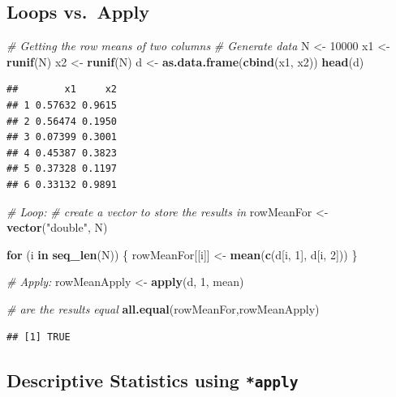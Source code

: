 \documentclass[]{book}
\makeatletter
\newenvironment{Shaded}{\begin{snugshade}}{\end{snugshade}}
\newcommand{\KeywordTok}[1]{\textcolor[rgb]{0.13,0.29,0.53}{\textbf{#1}}}
\newcommand{\DecValTok}[1]{\textcolor[rgb]{0.00,0.00,0.81}{#1}}
\newcommand{\StringTok}[1]{\textcolor[rgb]{0.31,0.60,0.02}{#1}}
\newcommand{\CommentTok}[1]{\textcolor[rgb]{0.56,0.35,0.01}{\textit{#1}}}
\newcommand{\ControlFlowTok}[1]{\textcolor[rgb]{0.13,0.29,0.53}{\textbf{#1}}}
\newcommand{\NormalTok}[1]{#1}
\newenvironment{kframe}{%
\medskip{}
\setlength{\fboxsep}{.8em}
 \def\at@end@of@kframe{}%
 \ifinner\ifhmode%
  \def\at@end@of@kframe{\end{minipage}}%
  \begin{minipage}{\columnwidth}%
 \fi\fi%
 \def\FrameCommand##1{\hskip\@totalleftmargin \hskip-\fboxsep
 \colorbox{shadecolor}{##1}\hskip-\fboxsep
     \hskip-\linewidth \hskip-\@totalleftmargin \hskip\columnwidth}%
 \MakeFramed {\advance\hsize-\width
   \@totalleftmargin\z@ \linewidth\hsize
   \@setminipage}}%
 {\par\unskip\endMakeFramed%
 \at@end@of@kframe}
\renewenvironment{Shaded}{\begin{kframe}}{\end{kframe}}
\theoremstyle{definition}
\theoremstyle{definition}
\theoremstyle{definition}
\theoremstyle{remark}
\makeatother
\begin{document}
\subsection{Loops vs.~Apply}\label{loops-vs.apply}

\begin{Shaded}
\begin{Highlighting}[]
\CommentTok{# Getting the row means of two columns}
\CommentTok{# Generate data}
\NormalTok{N <-}\StringTok{ }\DecValTok{10000}
\NormalTok{x1 <-}\StringTok{ }\KeywordTok{runif}\NormalTok{(N)}
\NormalTok{x2 <-}\StringTok{ }\KeywordTok{runif}\NormalTok{(N)}
\NormalTok{d <-}\StringTok{ }\KeywordTok{as.data.frame}\NormalTok{(}\KeywordTok{cbind}\NormalTok{(x1, x2))}
\KeywordTok{head}\NormalTok{(d)}
\end{Highlighting}
\end{Shaded}

\begin{verbatim}
##        x1     x2
## 1 0.57632 0.9615
## 2 0.56474 0.1950
## 3 0.07399 0.3001
## 4 0.45387 0.3823
## 5 0.37328 0.1197
## 6 0.33132 0.9891
\end{verbatim}

\begin{Shaded}
\begin{Highlighting}[]
\CommentTok{# Loop:}
\CommentTok{# create a vector to store the results in }
\NormalTok{rowMeanFor <-}\StringTok{ }\KeywordTok{vector}\NormalTok{(}\StringTok{"double"}\NormalTok{, N)}

\ControlFlowTok{for}\NormalTok{ (i }\ControlFlowTok{in} \KeywordTok{seq_len}\NormalTok{(N)) \{}
\NormalTok{        rowMeanFor[[i]] <-}\StringTok{ }\KeywordTok{mean}\NormalTok{(}\KeywordTok{c}\NormalTok{(d[i, }\DecValTok{1}\NormalTok{], d[i, }\DecValTok{2}\NormalTok{]))}
\NormalTok{\}}

\CommentTok{# Apply:}
\NormalTok{rowMeanApply <-}\StringTok{ }\KeywordTok{apply}\NormalTok{(d, }\DecValTok{1}\NormalTok{, mean)}

\CommentTok{# are the results equal}
\KeywordTok{all.equal}\NormalTok{(rowMeanFor,rowMeanApply)}
\end{Highlighting}
\end{Shaded}

\begin{verbatim}
## [1] TRUE
\end{verbatim}

\subsection{\texorpdfstring{Descriptive Statistics using
\texttt{*apply}}{Descriptive Statistics using *apply}}\label{descriptive-statistics-using-apply}
\end{document}
